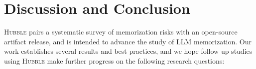 \documentclass{article} %
\begin{document}


 
% 
\section{Discussion and Conclusion}
\label{sec:discussion}

\textsc{Hubble} pairs a systematic survey of memorization risks with an open-source artifact release, and is intended to advance the study of LLM memorization. Our work establishes several results and best practices, and we hope follow-up studies using \textsc{Hubble} make further progress on the following research questions:
\end{document}
